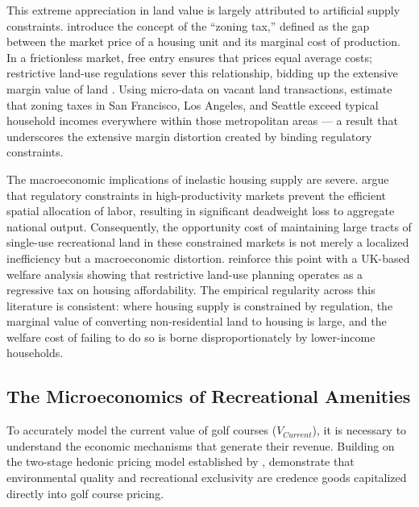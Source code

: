 \documentclass[11pt, letterpaper]{article}
\begin{document}
This extreme appreciation in land value is largely attributed to artificial supply constraints. \textcite{Glaeser2005} introduce the concept of the ``zoning tax,'' defined as the gap between the market price of a housing unit and its marginal cost of production. In a frictionless market, free entry ensures that prices equal average costs; restrictive land-use regulations sever this relationship, bidding up the extensive margin value of land \parencite{Gyourko2021}. Using micro-data on vacant land transactions, \textcite{Gyourko2021} estimate that zoning taxes in San Francisco, Los Angeles, and Seattle exceed typical household incomes everywhere within those metropolitan areas --- a result that underscores the extensive margin distortion created by binding regulatory constraints.

The macroeconomic implications of inelastic housing supply are severe. \textcite{Glaeser2017} argue that regulatory constraints in high-productivity markets prevent the efficient spatial allocation of labor, resulting in significant deadweight loss to aggregate national output. Consequently, the opportunity cost of maintaining large tracts of single-use recreational land in these constrained markets is not merely a localized inefficiency but a macroeconomic distortion. \textcite{Cheshire2002} reinforce this point with a UK-based welfare analysis showing that restrictive land-use planning operates as a regressive tax on housing affordability. The empirical regularity across this literature is consistent: where housing supply is constrained by regulation, the marginal value of converting non-residential land to housing is large, and the welfare cost of failing to do so is borne disproportionately by lower-income households.

\subsection{The Microeconomics of Recreational Amenities}

To accurately model the current value of golf courses ($V_{Current}$), it is necessary to understand the economic mechanisms that generate their revenue. Building on the two-stage hedonic pricing model established by \textcite{Rosen1974}, \textcite{Limehouse2010} demonstrate that environmental quality and recreational exclusivity are credence goods capitalized directly into golf course pricing.
\end{document}
